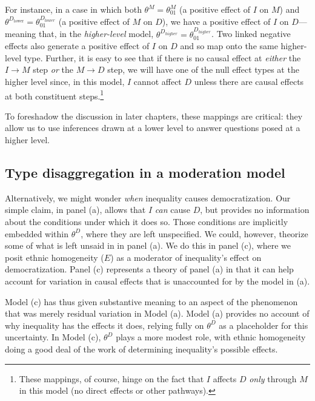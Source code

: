 \documentclass[12pt,]{book}
\let\rmarkdownfootnote\footnote%
\def\footnote{\protect\rmarkdownfootnote}
\begin{document}
For instance, in a case in which both \(\theta^M=\theta^M_{01}\) (a positive effect of \(I\) on \(M\)) and \(\theta^{D_{\text{lower}}}=\theta_{01}^{D_{lower}}\) (a positive effect of \(M\) on \(D\)), we have a positive effect of \(I\) on \(D\)---meaning that, in the \emph{higher-level} model, \(\theta^{D_{higher}}=\theta^{D_{higher}}_{01}\). Two linked negative effects also generate a positive effect of \(I\) on \(D\) and so map onto the same higher-level type. Further, it is easy to see that if there is no causal effect at \emph{either} the \(I \rightarrow M\) step \emph{or} the \(M \rightarrow D\) step, we will have one of the null effect types at the higher level since, in this model, \(I\) cannot affect \(D\) unless there are causal effects at both constituent steps.\footnote{These mappings, of course, hinge on the fact that \(I\) affects \(D\) \emph{only} through \(M\) in this model (no direct effects or other pathways).}

To foreshadow the discussion in later chapters, these mappings are critical: they allow us to use inferences drawn at a lower level to answer questions posed at a higher level.

\hypertarget{type-disaggregation-in-a-moderation-model}{%
\subsection{Type disaggregation in a moderation model}\label{type-disaggregation-in-a-moderation-model}}

Alternatively, we might wonder \emph{when} inequality causes democratization. Our simple claim, in panel (a), allows that \(I\) \emph{can} cause \(D\), but provides no information about the conditions under which it does so. Those conditions are implicitly embedded within \(\theta^D\), where they are left unspecified. We could, however, theorize some of what is left unsaid in in panel (a). We do this in panel (c), where we posit ethnic homogeneity (\(E\)) as a moderator of inequality's effect on democratization. Panel (c) represents a theory of panel (a) in that it can help account for variation in causal effects that is unaccounted for by the model in (a).

Model (c) has thus given substantive meaning to an aspect of the phenomenon that was merely residual variation in Model (a). Model (a) provides no account of why inequality has the effects it does, relying fully on \(\theta^D\) as a placeholder for this uncertainty. In Model (c), \(\theta^D\) plays a more modest role, with ethnic homogeneity doing a good deal of the work of determining inequality's possible effects.
\end{document}
